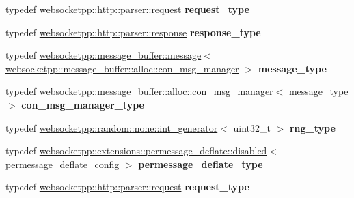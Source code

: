 \begin{DoxyCompactItemize}
\item 
typedef \hyperlink{classwebsocketpp_1_1http_1_1parser_1_1request}{websocketpp\+::http\+::parser\+::request} {\bfseries request\+\_\+type}\hypertarget{structstub__config_a7d7d444e1d7b2882bf22746be5c25f37}{}\label{structstub__config_a7d7d444e1d7b2882bf22746be5c25f37}

\item 
typedef \hyperlink{classwebsocketpp_1_1http_1_1parser_1_1response}{websocketpp\+::http\+::parser\+::response} {\bfseries response\+\_\+type}\hypertarget{structstub__config_af1ff5c46d4fc72bce3b5fb9f6090f4d6}{}\label{structstub__config_af1ff5c46d4fc72bce3b5fb9f6090f4d6}

\item 
typedef \hyperlink{classwebsocketpp_1_1message__buffer_1_1message}{websocketpp\+::message\+\_\+buffer\+::message}$<$ \hyperlink{classwebsocketpp_1_1message__buffer_1_1alloc_1_1con__msg__manager}{websocketpp\+::message\+\_\+buffer\+::alloc\+::con\+\_\+msg\+\_\+manager} $>$ {\bfseries message\+\_\+type}\hypertarget{structstub__config_a251ee9935f06ff126dbdcae6af183493}{}\label{structstub__config_a251ee9935f06ff126dbdcae6af183493}

\item 
typedef \hyperlink{classwebsocketpp_1_1message__buffer_1_1alloc_1_1con__msg__manager}{websocketpp\+::message\+\_\+buffer\+::alloc\+::con\+\_\+msg\+\_\+manager}$<$ message\+\_\+type $>$ {\bfseries con\+\_\+msg\+\_\+manager\+\_\+type}\hypertarget{structstub__config_a590413e515623cd51f1cd6c0f72f1018}{}\label{structstub__config_a590413e515623cd51f1cd6c0f72f1018}

\item 
typedef \hyperlink{classwebsocketpp_1_1random_1_1none_1_1int__generator}{websocketpp\+::random\+::none\+::int\+\_\+generator}$<$ uint32\+\_\+t $>$ {\bfseries rng\+\_\+type}\hypertarget{structstub__config_aeea6c7fab96f8cc229d78a822ff9cc5d}{}\label{structstub__config_aeea6c7fab96f8cc229d78a822ff9cc5d}

\item 
typedef \hyperlink{classwebsocketpp_1_1extensions_1_1permessage__deflate_1_1disabled}{websocketpp\+::extensions\+::permessage\+\_\+deflate\+::disabled}$<$ \hyperlink{structstub__config_1_1permessage__deflate__config}{permessage\+\_\+deflate\+\_\+config} $>$ {\bfseries permessage\+\_\+deflate\+\_\+type}\hypertarget{structstub__config_a542a8c30b8eec0e129d9487b3a598bdb}{}\label{structstub__config_a542a8c30b8eec0e129d9487b3a598bdb}

\item 
typedef \hyperlink{classwebsocketpp_1_1http_1_1parser_1_1request}{websocketpp\+::http\+::parser\+::request} {\bfseries request\+\_\+type}\hypertarget{structstub__config_a7d7d444e1d7b2882bf22746be5c25f37}{}\label{structstub__config_a7d7d444e1d7b2882bf22746be5c25f37}


\end{DoxyCompactItemize}
